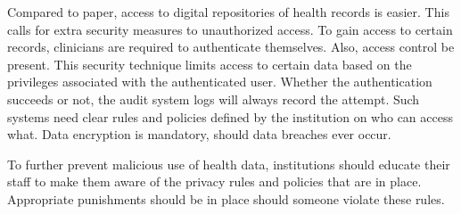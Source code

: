     Compared to paper, access to digital repositories of health records is easier. This calls for extra security measures to unauthorized access. To gain access to certain records, clinicians are required to authenticate themselves. Also, access control be present. This security technique limits access to certain data based on the privileges associated with the authenticated user. Whether the authentication succeeds or not, the audit system logs will always record the attempt. Such systems need clear rules and policies defined by the institution on who can access what. Data encryption is mandatory, should data breaches ever occur.

    To further prevent malicious use of health data, institutions should educate their staff to make them aware of the privacy rules and policies that are in place. Appropriate punishments should be in place should someone violate these rules.